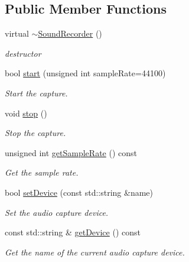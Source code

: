 \subsection*{Public Member Functions}
\begin{DoxyCompactItemize}
\item 
\mbox{\label{classsf_1_1_sound_recorder_acc599e61aaa47edaae88cf43f0a43549}} 
virtual \hyperlink{classsf_1_1_sound_recorder_acc599e61aaa47edaae88cf43f0a43549}{$\sim$\+Sound\+Recorder} ()
\begin{DoxyCompactList}\small\item\em destructor \end{DoxyCompactList}\item 
bool \hyperlink{classsf_1_1_sound_recorder_a715f0fd2f228c83d79aaedca562ae51f}{start} (unsigned int sample\+Rate=44100)
\begin{DoxyCompactList}\small\item\em Start the capture. \end{DoxyCompactList}\item 
void \hyperlink{classsf_1_1_sound_recorder_a8d9c8346aa9aa409cfed4a1101159c4c}{stop} ()
\begin{DoxyCompactList}\small\item\em Stop the capture. \end{DoxyCompactList}\item 
unsigned int \hyperlink{classsf_1_1_sound_recorder_aed292c297a3e0d627db4eb5c18f58c44}{get\+Sample\+Rate} () const
\begin{DoxyCompactList}\small\item\em Get the sample rate. \end{DoxyCompactList}\item 
bool \hyperlink{classsf_1_1_sound_recorder_a8eb3e473292c16e874322815836d3cd3}{set\+Device} (const std\+::string \&name)
\begin{DoxyCompactList}\small\item\em Set the audio capture device. \end{DoxyCompactList}\item 
const std\+::string \& \hyperlink{classsf_1_1_sound_recorder_ab16cd53c6884cbf3380c017cee72ba81}{get\+Device} () const
\begin{DoxyCompactList}\small\item\em Get the name of the current audio capture device. \end{DoxyCompactList}\item 

\end{DoxyCompactItemize}
